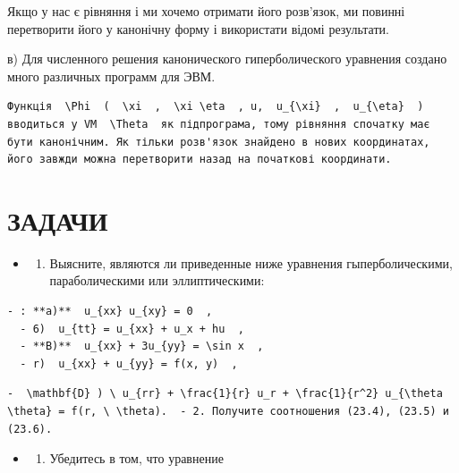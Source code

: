 \documentclass[
  ukrainian,
]{article}
\providecommand{\tightlist}{%
  \setlength{\itemsep}{0pt}\setlength{\parskip}{0pt}}
\begin{document}
Якщо у нас є рівняння і ми хочемо отримати його розв'язок, ми повинні
перетворити його у канонічну форму і використати відомі результати.

в) Для численного решения канонического гиперболического уравнения
создано много различных программ для ЭВМ.

\begin{verbatim}
Функція  \Phi  (  \xi  ,  \xi \eta  , u,  u_{\xi}  ,  u_{\eta}  ) вводиться у VM  \Theta  як підпрограма, тому рівняння спочатку має бути канонічним. Як тільки розв'язок знайдено в нових координатах, його завжди можна перетворити назад на початкові координати.
\end{verbatim}

\section{ЗАДАЧИ}\label{ux437ux430ux434ux430ux447ux438-2}

\begin{itemize}
\tightlist
\item
  \begin{enumerate}
  \def\labelenumi{\arabic{enumi}.}
  \tightlist
  \item
    Выясните, являются ли приведенные ниже уравнения гыперболическими,
    параболическими или эллиптическими:
  \end{enumerate}
\end{itemize}

\begin{verbatim}
- : **a)**  u_{xx} u_{xy} = 0  ,
  - 6)  u_{tt} = u_{xx} + u_x + hu  ,
  - **B)**  u_{xx} + 3u_{yy} = \sin x  ,
  - r)  u_{xx} + u_{yy} = f(x, y)  ,
\end{verbatim}

\begin{verbatim}
-  \mathbf{D} ) \ u_{rr} + \frac{1}{r} u_r + \frac{1}{r^2} u_{\theta \theta} = f(r, \ \theta).  - 2. Получите соотношения (23.4), (23.5) и (23.6).
\end{verbatim}

\begin{itemize}
\tightlist
\item
  \begin{enumerate}
  \def\labelenumi{\arabic{enumi}.}
  \setcounter{enumi}{2}
  \tightlist
  \item
    Убедитесь в том, что уравнение
  \end{enumerate}
\end{itemize}
\end{document}
